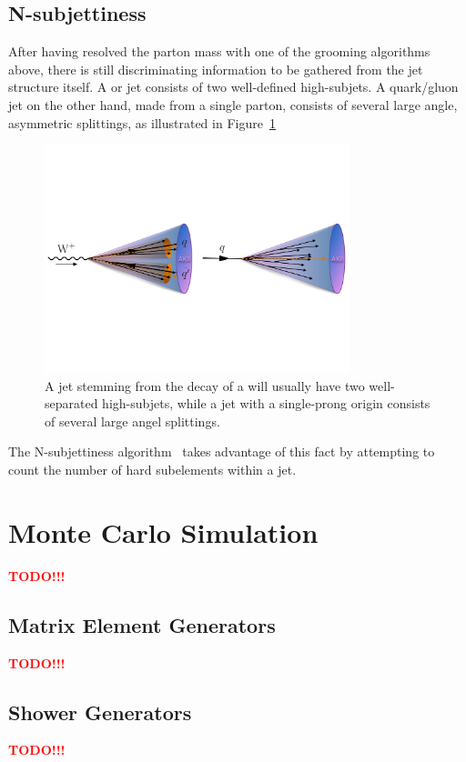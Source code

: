 \subsection{N-subjettiness}
After having resolved the parton mass with one of the grooming algorithms above, there is still discriminating information to be gathered from the jet structure itself.
A \PW or \PZ jet consists of two well-defined high-\PT subjets. A quark/gluon jet on the other hand, made from a single parton, consists of several large angle, asymmetric splittings, as illustrated in Figure~\ref{fig:objreco:onevstwoprong}

\begin{figure}[ht] 
    \centering 
    \includegraphics[width=0.790\textwidth]{figures/event_reconstruction/tau21_sketch.pdf}
     \caption{A jet stemming from the decay of a \PW will usually have two well-separated high-\pt subjets, while a jet with a single-prong origin consists of several large angel splittings.}
     \label{fig:objreco:onevstwoprong}
 \end{figure}
 
 The N-subjettiness algorithm~\cite{Thaler:2010tr} takes advantage of this fact by attempting to count the number of hard subelements within a jet.

\section{Monte Carlo Simulation}
\textcolor{red}{\textbf{TODO!!!}}
\subsection{Matrix Element Generators}
\textcolor{red}{\textbf{TODO!!!}}
\subsection{Shower Generators}
\textcolor{red}{\textbf{TODO!!!}}
